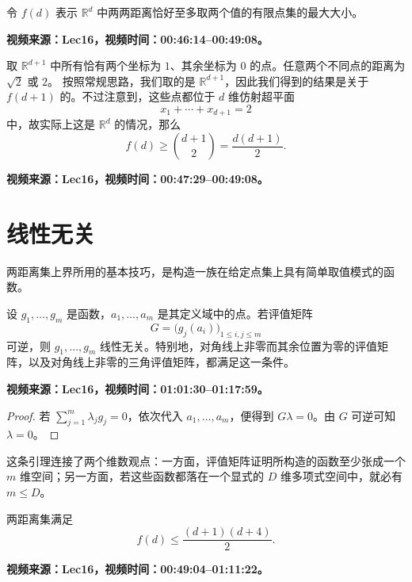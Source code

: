 令 $f(d)$ 表示 $\mathbb{R}^d$ 中两两距离恰好至多取两个值的有限点集的最大大小。

\ifdefined\VideoNotesTestMode
\textbf{视频来源：Lec16，视频时间：00:46:14--00:49:08。}
\fi

\begin{example}
取 $\mathbb{R}^{d+1}$ 中所有恰有两个坐标为 $1$、其余坐标为 $0$ 的点。任意两个不同点的距离为 $\sqrt{2}$ 或 $2$。
按照常规思路，我们取的是 $\mathbb{R}^{d+1}$，因此我们得到的结果是关于 $f(d+1)$ 的。不过注意到，这些点都位于 $d$ 维仿射超平面
\[
x_1+\cdots+x_{d+1}=2
\]
中，故实际上这是 $\mathbb R^d$ 的情况，那么
\[
f(d)\geq\binom{d+1}{2}=\frac{d(d+1)}2.
\]

\ifdefined\VideoNotesTestMode
\textbf{视频来源：Lec16，视频时间：00:47:29--00:49:08。}
\fi
\end{example}


\section{线性无关}

两距离集上界所用的基本技巧，是构造一族在给定点集上具有简单取值模式的函数。

\begin{lemma}
设 $g_1,\dots,g_m$ 是函数，$a_1,\dots,a_m$ 是其定义域中的点。若评值矩阵
\[
G=\bigl(g_j(a_i)\bigr)_{1\leq i,j\leq m}
\]
可逆，则 $g_1,\dots,g_m$ 线性无关。特别地，对角线上非零而其余位置为零的评值矩阵，以及对角线上非零的三角评值矩阵，都满足这一条件。

\ifdefined\VideoNotesTestMode
\textbf{视频来源：Lec16，视频时间：01:01:30--01:17:59。}
\fi
\end{lemma}

\begin{proof}
若 $\sum_{j=1}^m\lambda_jg_j=0$，依次代入 $a_1,\dots,a_m$，便得到
$G\lambda=0$。由 $G$ 可逆可知 $\lambda=0$。
\end{proof}

这条引理连接了两个维数观点：一方面，评值矩阵证明所构造的函数至少张成一个 $m$ 维空间；另一方面，若这些函数都落在一个显式的 $D$ 维多项式空间中，就必有 $m\leq D$。

\begin{theorem}
两距离集满足
\[
f(d)\leq\frac{(d+1)(d+4)}2.
\]

\ifdefined\VideoNotesTestMode
\textbf{视频来源：Lec16，视频时间：00:49:04--01:11:22。}
\fi
\end{theorem}

